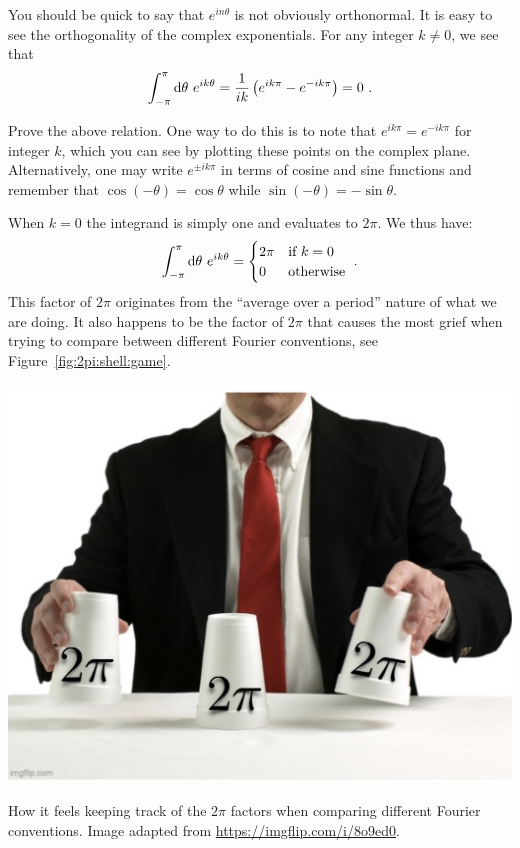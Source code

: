 You should be quick to say that $e^{in\theta}$ is not obviously orthonormal.
It is easy to see the orthogonality of the complex exponentials. For any integer $k\neq 0$, we see that
\begin{align}
    \int_{-\pi}^\pi \operatorname{d}\mkern-3mu^{}\mkern-1mu{\theta}\, \, e^{ik\theta}
    = \frac{1}{ik}
    \left(e^{ik\pi} - e^{-ik\pi}\right) = 0 \ .
\end{align}
\begin{exercise}
Prove the above relation. One way to do this is to note that $e^{ik\pi} = e^{-ik\pi}$  for integer $k$, which you can see by plotting these points on the complex plane. Alternatively, one may write $e^{\pm i k\pi}$ in terms of cosine and sine functions and remember that $\cos(-\theta) = \cos \theta$ while $\sin(-\theta) = -\sin\theta$.
\end{exercise}
When $k=0$ the integrand is simply one and evaluates to $2\pi$. We thus have:
\begin{align}
    \int_{-\pi}^\pi \operatorname{d}\mkern-3mu^{}\mkern-1mu{\theta}\, \, e^{ik\theta}
    = 
    \begin{cases}
    2\pi &\textnormal{if } k=0\\
    0 &\textnormal{otherwise}
    \end{cases}
    \ .
\end{align}
This factor of $2\pi$ originates from the ``average over a period'' nature of what we are doing. It also happens to be the factor of $2\pi$ that causes the most grief when trying to compare between different Fourier conventions, see Figure~\ref{fig:2pi:shell:game}.
\begin{marginfigure}%
    \includegraphics[width=\textwidth]{figures/2piShellGame.jpg}
    \caption{How it feels keeping track of the $2\pi$ factors when comparing different Fourier conventions. Image adapted from \url{https://imgflip.com/i/8o9ed0}.}
    \label{fig:2pi:shell:game}
\end{marginfigure}
